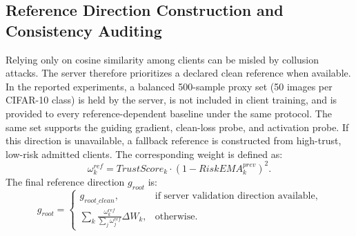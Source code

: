 \documentclass[11pt, a4paper]{article}
\begin{document}
\subsection{Reference Direction Construction and Consistency Auditing}
Relying only on cosine similarity among clients can be misled by collusion attacks. The server therefore prioritizes a declared clean reference when available. In the reported experiments, a balanced 500-sample proxy set (50 images per CIFAR-10 class) is held by the server, is not included in client training, and is provided to every reference-dependent baseline under the same protocol. The same set supports the guiding gradient, clean-loss probe, and activation probe. If this direction is unavailable, a fallback reference is constructed from high-trust, low-risk admitted clients. The corresponding weight is defined as:
\begin{equation}
    \omega_{k}^{ref} = TrustScore_{k} \cdot (1 - RiskEMA_{k}^{prev})^{2}.
\end{equation}
The final reference direction $g_{root}$ is:
\begin{equation}
    g_{root}=
    \begin{cases}
        g_{root\_clean},                                                      & \text{if server validation direction available}, \\
        \sum_{k} \frac{\omega_{k}^{ref}}{\sum_j \omega_{j}^{ref}} \Delta W_k, & \text{otherwise}.
    \end{cases}
\end{equation}
\end{document}
